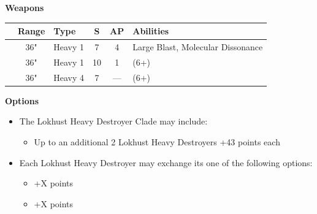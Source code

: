 \begin{minipage}[t]{0.72\textwidth}
	\vspace*{2em}
	\textbf{Weapons}
	
	\begin{tabular}{L{90 pt} c C{40pt} *{2}{c} >{\raggedright\arraybackslash}p{130pt}}
		& Range & Type & S & AP & Abilities \\
		\hline
		 & 36" & Heavy 1 & 7 & 4 & Large Blast, Molecular Dissonance \\
		 & 36" & Heavy 1 & 10 & 1 &   (6+) \\
		 & 36" & Heavy 4 & 7 & — &   (6+) \\
	\end{tabular}
	
	\vspace*{2em}
	\textbf{Options}
	\begin{itemize}
		\item The Lokhust Heavy Destroyer Clade may include:
		\begin{itemize}
			\item Up to an additional 2 Lokhust Heavy Destroyers \dotfill +43 points each
		\end{itemize}
		\item Each Lokhust Heavy Destroyer may exchange its  one of the following options:
		\begin{itemize}
			\item {} \dotfill +X points
			\item {} \dotfill +X points
		\end{itemize}
	\end{itemize}
\end{minipage}
\hspace{0.5em}



\newpage
\subsubsection[Triarch Stalker]{}

